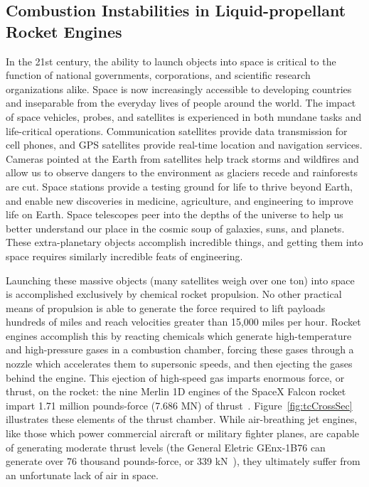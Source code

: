 \subsection{Combustion Instabilities in Liquid-propellant Rocket Engines}

In the 21st century, the ability to launch objects into space is critical to the function of national governments, corporations, and scientific research organizations alike. Space is now increasingly accessible to developing countries and inseparable from the everyday lives of people around the world. The impact of space vehicles, probes, and satellites is experienced in both mundane tasks and life-critical operations. Communication satellites provide data transmission for cell phones, and GPS satellites provide real-time location and navigation services. Cameras pointed at the Earth from satellites help track storms and wildfires and allow us to observe dangers to the environment as glaciers recede and rainforests are cut. Space stations provide a testing ground for life to thrive beyond Earth, and enable new discoveries in medicine, agriculture, and engineering to improve life on Earth. Space telescopes peer into the depths of the universe to help us better understand our place in the cosmic soup of galaxies, suns, and planets. These extra-planetary objects accomplish incredible things, and getting them into space requires similarly incredible feats of engineering.

Launching these massive objects (many satellites weigh over one ton) into space is accomplished exclusively by chemical rocket propulsion. No other practical means of propulsion is able to generate the force required to lift payloads hundreds of miles and reach velocities greater than 15,000 miles per hour. Rocket engines accomplish this by reacting chemicals which generate high-temperature and high-pressure gases in a combustion chamber, forcing these gases through a nozzle which accelerates them to supersonic speeds, and then ejecting the gases behind the engine. This ejection of high-speed gas imparts enormous force, or thrust, on the rocket: the nine Merlin 1D engines of the SpaceX Falcon rocket impart 1.71 million pounds-force (7.686 MN) of thrust~\cite{falconGuide}. Figure~\ref{fig:tcCrossSec} illustrates these elements of the thrust chamber. While air-breathing jet engines, like those which power commercial aircraft or military fighter planes, are capable of generating moderate thrust levels (the General Eletric GEnx-1B76 can generate over 76 thousand pounds-force, or 339 kN~\cite{genxSpecs}), they ultimately suffer from an unfortunate lack of air in space.

